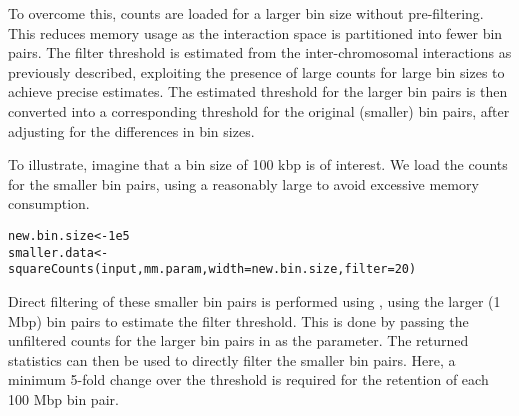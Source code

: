\documentclass{report}\usepackage[]{graphicx}\usepackage[usenames,dvipsnames]{color}
\newcommand{\hlnum}[1]{\textcolor[rgb]{0.816,0.125,0.439}{#1}}%
\newcommand{\hlopt}[1]{\textcolor[rgb]{0,0,0}{#1}}%
\newcommand{\hlstd}[1]{\textcolor[rgb]{0.251,0.251,0.251}{#1}}%
\newcommand{\hlkwb}[1]{\textcolor[rgb]{0,0,0}{#1}}%
\newcommand{\hlkwc}[1]{\textcolor[rgb]{0.251,0.251,0.251}{#1}}%
\newcommand{\hlkwd}[1]{\textcolor[rgb]{0.878,0.439,0.125}{#1}}%
\newenvironment{knitrout}{}{} %
\begin{document}
To overcome this, counts are loaded for a larger bin size without pre-filtering.
This reduces memory usage as the interaction space is partitioned into fewer bin pairs.
The filter threshold is estimated from the inter-chromosomal interactions as previously described, exploiting the presence of large counts for large bin sizes to achieve precise estimates.
The estimated threshold for the larger bin pairs is then converted into a corresponding threshold for the original (smaller) bin pairs, after adjusting for the differences in bin sizes.

To illustrate, imagine that a bin size of 100 kbp is of interest.
We load the counts for the smaller bin pairs, using a reasonably large  to avoid excessive memory consumption.

\begin{knitrout}
\color{fgcolor}\begin{kframe}
\begin{alltt}
\hlstd{new.bin.size} \hlkwb{<-} \hlnum{1e5}
\hlstd{smaller.data} \hlkwb{<-} \hlkwd{squareCounts}\hlstd{(input, mm.param,} \hlkwc{width}\hlstd{=new.bin.size,} \hlkwc{filter}\hlstd{=}\hlnum{20}\hlstd{)}
\end{alltt}
\end{kframe}
\end{knitrout}

Direct filtering of these smaller bin pairs is performed using , using the larger (1 Mbp) bin pairs to estimate the filter threshold.
This is done by passing the unfiltered counts for the larger bin pairs in  as the  parameter.
The returned statistics can then be used to directly filter the smaller bin pairs.
Here, a minimum 5-fold change over the threshold is required for the retention of each 100 Mbp bin pair.

\begin{knitrout}
\color{fgcolor}
\end{knitrout}
\end{document}
